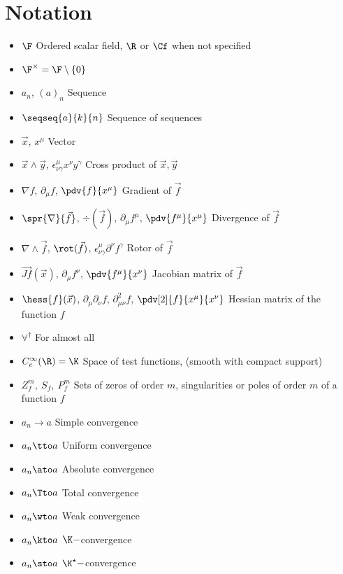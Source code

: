 \documentclass[../mmf.tex]{subfiles}
\begin{document}
\chapter*{Notation}
\begin{itemize}
\item $\F$ Ordered scalar field, $\R$ or $\Cf$ when not specified
\item $\F^{\times}=\F\setminus\left\{ 0 \right\}$
\item $a_n$, $(a)_n$ Sequence
\item $\seqseq{a}{k}{n}$ Sequence of sequences
\item $\vec{x}$, $x^\mu$ Vector
\item $\vec{x}\wedge\vec{y}$, $\epsilon^\mu_{\nu\gamma}x^\nu y^\gamma$ Cross product of $\vec{x},\vec{y}$
\item $\nabla f$, $\partial_\mu f$, $\pdv{f}{x^\mu}$ Gradient of $\vec{f}$
\item $\spr{\nabla}{\vec{f}}$, $\div(\vec{f})$, $\partial_\mu f^\mu$, $\pdv{f^\mu}{x^\mu}$ Divergence of $\vec{f}$
\item $\nabla\wedge\vec{f}$, $\rot(\vec{f})$, $\epsilon^\mu_{\nu\gamma}\partial^\nu f^\gamma$ Rotor of $\vec{f}$
\item $\vec{Jf}(\vec{x})$, $\partial_\mu f^\nu$, $\pdv{f^\mu}{x^\nu}$ Jacobian matrix of $\vec{f}$
\item $\hess{f}(\vec{x})$, $\partial_\mu\partial_\nu f$, $\partial^2_{\mu\nu}f$, $\pdv[2]{f}{x^\mu}{x^\nu}$ Hessian matrix of the function $f$
\item $\forall^{\dagger}$ For almost all
\item $C_c^\infty(\R)=\K$ Space of test functions, (smooth with compact support)
\item $Z_f^m,\ S_f,\ P_f^m$ Sets of zeros of order $m$, singularities or poles of order $m$ of a function $f$
\item $a_n\to a$ Simple convergence
\item $a_n\tto a$ Uniform convergence
\item $a_n\ato a$ Absolute convergence
\item $a_n\Tto a$ Total convergence
\item $a_n\wto a$ Weak convergence
\item $a_n\kto a$ $\K-$convergence
\item $a_n\sto a$ $\K^\star-$convergence
\end{itemize}
\end{document}
